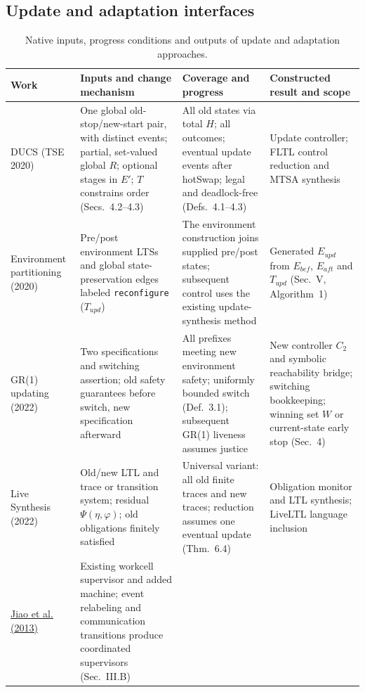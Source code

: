 \documentclass[11pt]{article}
\begin{document}
\subsection{Update and adaptation interfaces}
\begin{table}[!htbp]
\caption{Native inputs, progress conditions and outputs of update and adaptation approaches.}
\label{tab:supp-native}
\centering\footnotesize
\setlength{\tabcolsep}{3pt}\renewcommand{\arraystretch}{1.05}
\begin{tabular}{@{}>{\raggedright\arraybackslash}p{.15\linewidth}>{\raggedright\arraybackslash}p{.28\linewidth}>{\raggedright\arraybackslash}p{.29\linewidth}>{\raggedright\arraybackslash}p{.23\linewidth}@{}}
\toprule
Work & Inputs and change mechanism & Coverage and progress & Constructed result and scope\\
\midrule
DUCS (TSE 2020)
& One global old-stop/new-start pair, with distinct events; partial, set-valued global $R$; optional stages in $E'$; $T$ constrains order (Secs.~4.2--4.3)
& All old states via total $H$; all outcomes; eventual update events after hotSwap; legal and deadlock-free (Defs.~4.1--4.3)
& Update controller; FLTL control reduction and MTSA synthesis\\
Environment partitioning (2020)
& Pre/post environment LTSs and global state-preservation edges labeled \texttt{reconfigure} ($T_{upd}$)
& The environment construction joins supplied pre/post states; subsequent control uses the existing update-synthesis method
& Generated $E_{upd}$ from $E_{bef}$, $E_{aft}$ and $T_{upd}$ (Sec.~V, Algorithm~1)\\
GR(1) updating (2022)
& Two specifications and switching assertion; old safety guarantees before switch, new specification afterward
& All prefixes meeting new environment safety; uniformly bounded switch (Def.~3.1); subsequent GR(1) liveness assumes justice
& New controller $C_2$ and symbolic reachability bridge; switching bookkeeping; winning set $W$ or current-state early stop (Sec.~4)\\
Live Synthesis (2022)
& Old/new LTL and trace or transition system; residual $\Psi(\eta,\varphi)$; old obligations finitely satisfied
& Universal variant: all old finite traces and new traces; reduction assumes one eventual update (Thm.~6.4)
& Obligation monitor and LTL synthesis; LiveLTL language inclusion\\
\href{main.pdf#cite.JiaoGanXiao2013Reconfiguration}{Jiao et al. (2013)}
& Existing workcell supervisor and added machine; event relabeling and communication transitions produce coordinated supervisors (Sec.~III.B)

\end{tabular}
\end{table}
\end{document}
